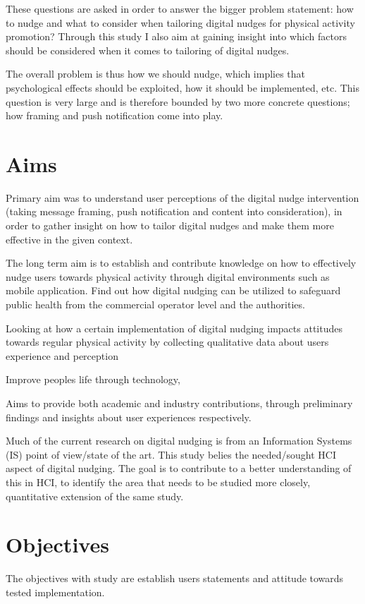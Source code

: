 These questions are asked in order to answer the bigger problem statement: how to nudge and what to consider when tailoring digital nudges for physical activity promotion? Through this study I also aim at gaining insight into which factors should be considered when it comes to tailoring of digital nudges.  

The overall problem is thus how we should nudge, which implies that psychological effects should be exploited, how it should be implemented, etc. This question is very large and is therefore bounded by two more concrete questions; how framing and push notification come into play.

\section{Aims}

Primary aim was to understand user perceptions of the digital nudge intervention (taking message framing, push notification and content into consideration), in order to gather insight on how to tailor digital nudges and make them more effective in the given context.

The long term aim is to establish and contribute knowledge on how to effectively nudge users towards physical activity through digital environments such as mobile application. Find out how digital nudging can be utilized to safeguard public health from the commercial operator level and the authorities. 

Looking at how a certain implementation of digital nudging impacts attitudes towards regular physical activity by collecting qualitative data about users experience and perception

Improve peoples life through technology, 

Aims to provide both academic and industry contributions, through preliminary findings and  insights about user experiences respectively. 

Much of the current research on digital nudging is from an Information Systems (IS) point of view/state of the art. This study belies the needed/sought HCI aspect of digital nudging. The goal is to contribute to a better understanding of this in HCI, to identify the area that needs to be studied more closely, quantitative extension of the same study.

\section{Objectives}
The objectives with study are establish users statements and attitude towards tested implementation. 

